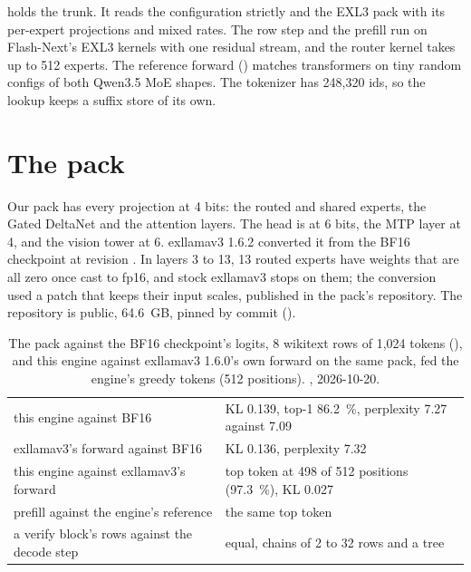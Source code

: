  holds the trunk. It reads the configuration strictly and the EXL3 pack with its per-expert projections and mixed rates. The row step and the prefill run on Flash-Next's EXL3 kernels with one residual stream, and the router kernel takes up to 512 experts. The reference forward () matches transformers on tiny random configs of both Qwen3.5 MoE shapes. The tokenizer has 248,320 ids, so the lookup keeps a suffix store of its own.

\section{The pack}

Our pack has every projection at 4 bits: the routed and shared experts, the Gated DeltaNet and the attention layers. The head is at 6 bits, the MTP layer at 4, and the vision tower at 6. exllamav3 1.6.2 converted it from the BF16 checkpoint at revision . In layers 3 to 13, 13 routed experts have weights that are all zero once cast to fp16, and stock exllamav3 stops on them; the conversion used a patch that keeps their input scales, published in the pack's repository. The repository  is public, 64.6~GB, pinned by commit ().

\begin{table}[htbp]
\centering\small
\caption[Ornith's quality]{The pack against the BF16 checkpoint's logits, 8 wikitext rows of 1,024 tokens (), and this engine against exllamav3 1.6.0's own forward on the same pack, fed the engine's greedy tokens (512 positions). \measured, 2026-10-20.}\label{tab:orn-quality}
\begin{tabularx}{\linewidth}{@{}L{.4\linewidth}Y@{}}
\toprule
{} &  \\
\midrule
this engine against BF16 & KL 0.139, top-1 86.2~\%, perplexity 7.27 against 7.09 \\
exllamav3's forward against BF16 & KL 0.136, perplexity 7.32 \\
this engine against exllamav3's forward & top token at 498 of 512 positions (97.3~\%), KL 0.027 \\
prefill against the engine's reference & the same top token \\
a verify block's rows against the decode step & equal, chains of 2 to 32 rows and a tree \\
\bottomrule
\end{tabularx}
\end{table}

